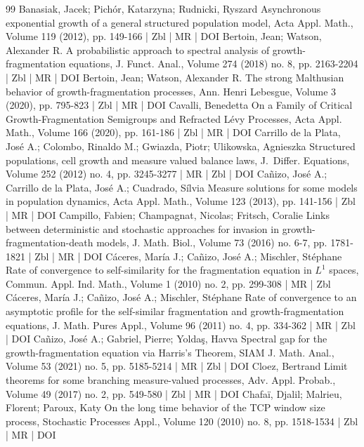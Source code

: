 \documentclass[10pt]{amsart}
\theoremstyle{definition}\newtheorem{defi}[theo]{Definition}\newtheorem{rema}[theo]{Remark}\newtheorem{exam}[theo]{Example}\newtheorem{exem}[theo]{Example}\newtheorem{nota}[theo]{Notation}
\newcommand{\1}{\mathds{1}}
\begin{document}
\begin{thebibliography}{99}
Banasiak, Jacek; Pichór, Katarzyna; Rudnicki, Ryszard Asynchronous exponential growth of a general structured population model, Acta Appl. Math., Volume 119 (2012), pp. 149-166 | Zbl | MR | DOI
Bertoin, Jean; Watson, Alexander R. A probabilistic approach to spectral analysis of growth-fragmentation equations, J. Funct. Anal., Volume 274 (2018) no. 8, pp. 2163-2204 | Zbl | MR | DOI
Bertoin, Jean; Watson, Alexander R. The strong Malthusian behavior of growth-fragmentation processes, Ann. Henri Lebesgue, Volume 3 (2020), pp. 795-823 | Zbl | MR | DOI
Cavalli, Benedetta On a Family of Critical Growth-Fragmentation Semigroups and Refracted Lévy Processes, Acta Appl. Math., Volume 166 (2020), pp. 161-186 | Zbl | MR | DOI
Carrillo de la Plata, José A.; Colombo, Rinaldo M.; Gwiazda, Piotr; Ulikowska, Agnieszka Structured populations, cell growth and measure valued balance laws, J. Differ. Equations, Volume 252 (2012) no. 4, pp. 3245-3277 | MR | Zbl | DOI
Cañizo, José A.; Carrillo de la Plata, José A.; Cuadrado, Sílvia Measure solutions for some models in population dynamics, Acta Appl. Math., Volume 123 (2013), pp. 141-156 | Zbl | MR | DOI
Campillo, Fabien; Champagnat, Nicolas; Fritsch, Coralie Links between deterministic and stochastic approaches for invasion in growth-fragmentation-death models, J. Math. Biol., Volume 73 (2016) no. 6-7, pp. 1781-1821 | Zbl | MR | DOI
Cáceres, María J.; Cañizo, José A.; Mischler, Stéphane Rate of convergence to self-similarity for the fragmentation equation in ${L}^1$ spaces, Commun. Appl. Ind. Math., Volume 1 (2010) no. 2, pp. 299-308 | MR | Zbl
Cáceres, María J.; Cañizo, José A.; Mischler, Stéphane Rate of convergence to an asymptotic profile for the self-similar fragmentation and growth-fragmentation equations, J. Math. Pures Appl., Volume 96 (2011) no. 4, pp. 334-362 | MR | Zbl | DOI
Cañizo, José A.; Gabriel, Pierre; Yoldaş, Havva Spectral gap for the growth-fragmentation equation via Harris’s Theorem, SIAM J. Math. Anal., Volume 53 (2021) no. 5, pp. 5185-5214 | MR | Zbl | DOI
Cloez, Bertrand Limit theorems for some branching measure-valued processes, Adv. Appl. Probab., Volume 49 (2017) no. 2, pp. 549-580 | Zbl | MR | DOI
Chafaï, Djalil; Malrieu, Florent; Paroux, Katy On the long time behavior of the TCP window size process, Stochastic Processes Appl., Volume 120 (2010) no. 8, pp. 1518-1534 | Zbl | MR | DOI

\end{thebibliography}
\end{document}
